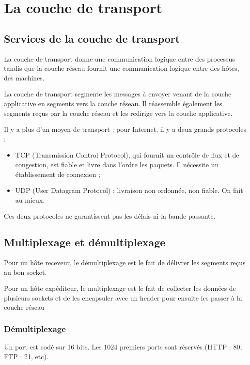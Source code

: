 \chapter{La couche de transport}

\section{Services de la couche de transport}

La couche de transport donne une communication logique entre des processus tandis que la couche réseau fournit une communication logique entre des hôtes, des machines.

La couche de transport segmente les messages à envoyer venant de la couche applicative en segments vers la couche réseau. Il réassemble également les segments reçus par la couche réseau et les redirige vers la couche applicative.

Il y a plus d'un moyen de transport ; pour Internet, il y a deux grands protocoles :

\begin{itemize}
	\item TCP (Transmission Control Protocol), qui fournit un contrôle de flux et de congestion, est fiable et livre dans l'ordre les paquets. Il nécessite un établissement de connexion ;
	\item UDP (User Datagram Protocol) : livraison non ordonnée, non fiable. On fait au mieux.
\end{itemize}

Ces deux protocoles ne garantissent pas les délais ni la bande passante.


\section{Multiplexage et démultiplexage}
	Pour un hôte receveur, le démultiplexage est le fait de délivrer les segments reçus au bon socket. 
	
	Pour un hôte expéditeur, le multiplexage est le fait de collecter les données de plusieurs sockets et de les encapsuler avec un header pour ensuite les passer à la couche réseau

	\subsection{Démultiplexage}
	
	Un port est codé sur 16 bits. Les 1024 premiers ports sont réservés (HTTP : 80, FTP : 21, etc).
	
